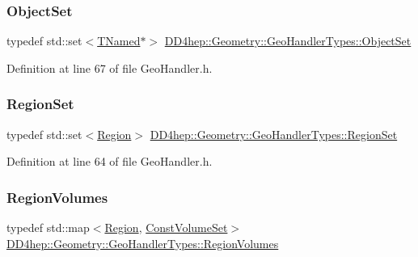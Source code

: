 \subsubsection{\texorpdfstring{Object\+Set}{ObjectSet}}
{\footnotesize\ttfamily typedef std\+::set$<$\hyperlink{class_t_named}{T\+Named}$\ast$$>$ \hyperlink{class_d_d4hep_1_1_geometry_1_1_geo_handler_types_a1e77c8aec4a291253804630c590af1d8}{D\+D4hep\+::\+Geometry\+::\+Geo\+Handler\+Types\+::\+Object\+Set}}



Definition at line 67 of file Geo\+Handler.\+h.

\hypertarget{class_d_d4hep_1_1_geometry_1_1_geo_handler_types_a871413f297c033590fb56dcba5cc7dac}{}\label{class_d_d4hep_1_1_geometry_1_1_geo_handler_types_a871413f297c033590fb56dcba5cc7dac} 
\subsubsection{\texorpdfstring{Region\+Set}{RegionSet}}
{\footnotesize\ttfamily typedef std\+::set$<$\hyperlink{class_d_d4hep_1_1_geometry_1_1_region}{Region}$>$ \hyperlink{class_d_d4hep_1_1_geometry_1_1_geo_handler_types_a871413f297c033590fb56dcba5cc7dac}{D\+D4hep\+::\+Geometry\+::\+Geo\+Handler\+Types\+::\+Region\+Set}}



Definition at line 64 of file Geo\+Handler.\+h.

\hypertarget{class_d_d4hep_1_1_geometry_1_1_geo_handler_types_a8e121c3a06f16781bbabba4528136654}{}\label{class_d_d4hep_1_1_geometry_1_1_geo_handler_types_a8e121c3a06f16781bbabba4528136654} 
\subsubsection{\texorpdfstring{Region\+Volumes}{RegionVolumes}}
{\footnotesize\ttfamily typedef std\+::map$<$\hyperlink{class_d_d4hep_1_1_geometry_1_1_region}{Region}, \hyperlink{class_d_d4hep_1_1_geometry_1_1_geo_handler_types_ae294545274767eb8cf886a303033b351}{Const\+Volume\+Set}$>$ \hyperlink{class_d_d4hep_1_1_geometry_1_1_geo_handler_types_a8e121c3a06f16781bbabba4528136654}{D\+D4hep\+::\+Geometry\+::\+Geo\+Handler\+Types\+::\+Region\+Volumes}}



